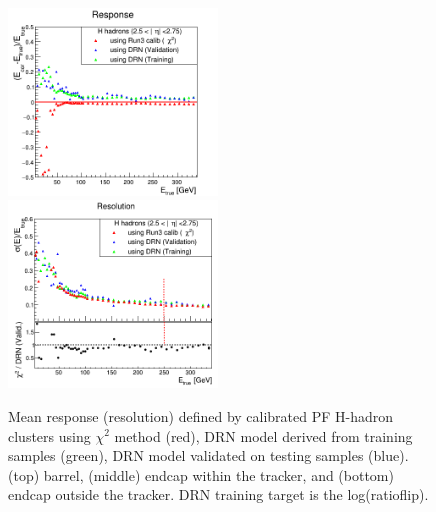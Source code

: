 \begin{figure}
\includegraphics[width=0.495\textwidth]{./plots_pdf/HCAL_plots/Trained_target_ratioflip_0_500_10/pdf/H_ec_out/EC_outside_tracker_corrEtaEndcapHcal.png}
\includegraphics[width=0.495\textwidth]{./plots_pdf/HCAL_plots/Trained_target_ratioflip_0_500_10/pdf/H_ec_out/EC_outside_tracker_corrEtaEndcapHcal_reso.png}

\caption[Response (resolution) vs. \pt of the PF H-hadron cluster - traget log(ratioflip)]{Mean response (resolution) defined by calibrated PF H-hadron clusters using $\chi^{2}$ method (red), DRN model derived from training samples (green), DRN model validated on testing samples (blue). (top) barrel, (middle) endcap within the tracker, and (bottom) endcap outside the tracker. DRN training target is the log(ratioflip).}
\label{fig:H_logratioflip}

\end{figure}
